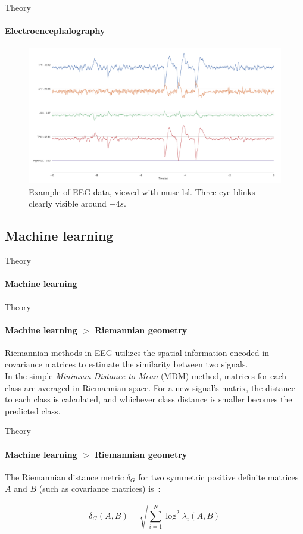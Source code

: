 \documentclass[xcolor={dvipsnames,table},12pt]{beamer}
\newif\ifplacelogo{}  %
\begin{document}
\placelogofalse{}
\begin{frame}{Theory}
    \framesubtitle{Electroencephalography}
    \vspace*{-5mm}

    \begin{figure}
        \hspace*{-10mm}
        \includegraphics[width=\paperwidth]{img/muselsl-signal.png}
        \caption{Example of EEG data, viewed with muse-lsl. Three eye blinks clearly visible around $-4s$.}
    \end{figure}
\end{frame}
\placelogotrue{}

\subsection{Machine learning}
\begin{frame}{Theory}
    \framesubtitle{Machine learning}
\end{frame}

\begin{frame}{Theory}
    \framesubtitle{Machine learning $>$ Riemannian geometry}
    
    Riemannian methods in EEG utilizes the spatial information encoded in covariance matrices to estimate the similarity between two signals.
    \\
    \vspace{1em}
    In the simple \emph{Minimum Distance to Mean} (MDM) method, matrices for each class are averaged in Riemannian space. For a new signal's matrix, the distance to each class is calculated, and whichever class distance is smaller becomes the predicted class.
\end{frame}

\begin{frame}{Theory}
    \framesubtitle{Machine learning $>$ Riemannian geometry}
    
    \small The Riemannian distance metric $\delta_G$ for two symmetric positive definite matrices $A$ and $B$ (such as covariance matrices) is~\cite{grafarend_metric_2003}:

        \[ \delta_G(A, B) = \sqrt{\sum_{i=1}^N \log^2 \lambda_i (A, B) } \]
\end{frame}
\end{document}
